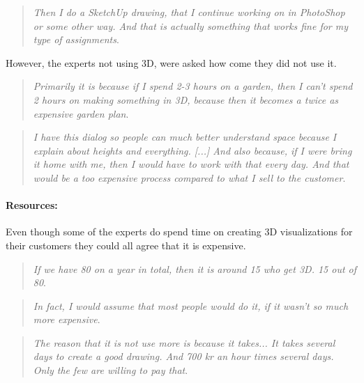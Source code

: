 \begin{quote}
	\textit{Then I do a SketchUp drawing, that I continue working on in PhotoShop or some other way. And that is actually something that works fine for my type of assignments}\label{quote:expertTech2}.\\
\end{quote}
However, the experts not using 3D, were asked how come they did not use it.
\begin{quote}
	\textit{Primarily it is because if I spend 2-3 hours on a garden, then I can't spend 2 hours on making something in 3D, because then it becomes a twice as expensive garden plan}\label{quote:expertTech3}.\\
\end{quote}
\begin{quote}
	\textit{I have this dialog so people can much better understand space because I explain about heights and everything. [...] And also because, if I were bring it home with me, then I would have to work with that every day. And that would be a too expensive process compared to what I sell to the customer}\label{quote:expertTech4}.\\
\end{quote}

\paragraph*{Resources:}
Even though some of the experts do spend time on creating 3D visualizations for their customers they could all agree that it is expensive.
\begin{quote}
	\textit{If we have 80 on a year in total, then it is around 15 who get 3D. 15 out of 80}\label{quote:expertRessources1}.\\
\end{quote}

\begin{quote}
	\textit{In fact, I would assume that most people would do it, if it wasn't so much more expensive}\label{quote:expertRessources2}.\\
\end{quote}

\begin{quote}
	\textit{The reason that it is not use more is because it takes... It takes several days to create a good drawing. And 700 kr an hour times several days. Only the few are willing to pay that}\label{quote:expertRessources3}.\\
\end{quote}


